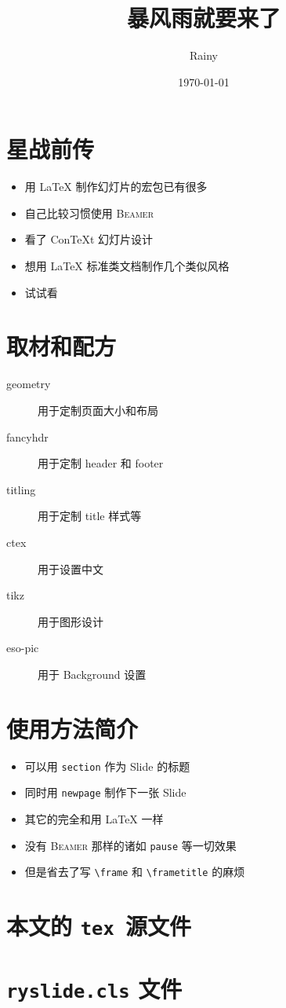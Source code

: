 \documentclass{ryslidepyramid}
\title{暴风雨就要来了}
\author{Rainy}
\date{\today}
\begin{document}
\myfrontcover
\tableofcontents\thispagestyle{empty}
\newpage\section{星战前传}
\begin{itemize}
    \item 用 \LaTeX{} 制作幻灯片的宏包已有很多
    \item 自己比较习惯使用 \textsc{Beamer}
    \item 看了 ConTeXt 幻灯片设计
    \item 想用 \LaTeX{} 标准类文档制作几个类似风格
    \item 试试看
\end{itemize}
\newpage\section{取材和配方}
\begin{description}
    \item[geometry] 用于定制页面大小和布局
    \item[fancyhdr] 用于定制 header 和 footer
    \item[titling] 用于定制 title 样式等
    \item[ctex] 用于设置中文
    \item[tikz] 用于图形设计
    \item[eso-pic] 用于 {\sc Background} 设置
\end{description}
\newpage\section{使用方法简介}
\begin{itemize}
    \item 可以用{ \tt section} 作为 Slide 的标题
    \item 同时用{ \tt newpage} 制作下一张 Slide
    \item 其它的完全和用 \LaTeX{} 一样
    \item 没有{ \textsc{Beamer}} 那样的诸如{ \tt pause} 等一切效果
    \item 但是省去了写{ \verb"\frame"} 和{ \verb"\frametitle"} 的麻烦
\end{itemize}
\newpage\section{本文的{ \tt tex }源文件}
\newpage\section{{\tt ryslide.cls} 文件}
\end{document}
